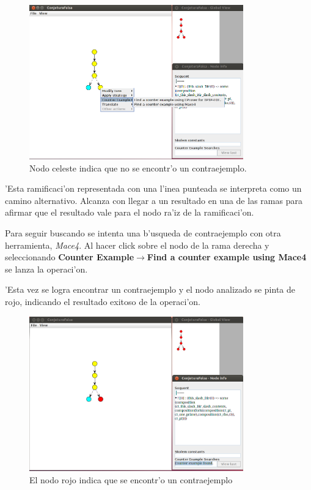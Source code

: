 \begin{figure}[H]
	\includegraphics[width=350px]{img/conjetura_falsa_3.png}
	\centering
	\caption{Nodo celeste indica que no se encontr'o un contraejemplo.}
\end{figure}

'Esta ramificaci'on representada con una l'inea punteada se interpreta como un camino alternativo. Alcanza con llegar a un resultado en una de las ramas para afirmar que el resultado vale para el nodo ra'iz de la ramificaci'on.

Para seguir buscando se intenta una b'usqueda de contraejemplo con otra herramienta, \textit{Mace4}. Al hacer click sobre el nodo de la rama derecha y seleccionando \textbf{Counter Example$\rightarrow$Find a counter example using Mace4} se lanza la operaci'on.

'Esta vez se logra encontrar un contraejemplo y el nodo analizado se pinta de rojo, indicando el resultado exitoso de la operaci'on.

\begin{figure}[H]
	\includegraphics[width=350px]{img/conjetura_falsa_4.png}
	\centering
	\caption{El nodo rojo indica que se encontr'o un contraejemplo}
\end{figure}

